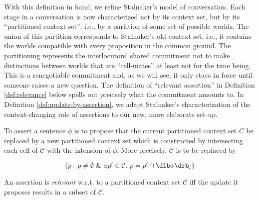 %
%
%
With this definition in hand, we refine Stalnaker's model of conversation. Each
stage in a conversation is now characterized not by its context set, but by its
``partitioned context set'', i.e., by a partition of some set of possible
worlds. The union of this partition corresponds to Stalnaker's old context set,
i.e., it contains the worlds compatible with every proposition in the common
ground. The partitioning represents the interlocutors' shared commitment not to
make distinctions between worlds that are ``cell-mates'' \dash at least not for
the time being. This is a renegotiable commitment and, as we will see, it only
stays in force until someone raises a new question. The definition of ``relevant
assertion'' in Definition \ref{def:relevance} below spells out precisely what
the commitment amounts to. In Definition \ref{def:update-by-assertion}, we adapt
Stalnaker's characterization of the context-changing role of assertions to our
new, more elaborate set-up.

\begin{definition}\label{def:update-by-assertion}
  To assert a sentence $\phi$ is to propose that the current partitioned context
  set $C$ be replaced by a new partitioned context set which is constructed by
  intersecting each cell of $\mathcal{C}$ with the intension of $\phi$. More
  precisely, $\mathcal{C}$ is to be replaced by

  $$\{p\co p\neq\emptyset\ \&\ \exists p'\in \mathcal{C}.\ p = p' \cap \svcent{\phi}\}$$
\end{definition}

\begin{definition}[Relevance]\label{def:relevance}
  An assertion is \emph{relevant} w.r.t. to a partitioned context set
  $\mathcal{C}$ iff the update it proposes results in a subset of $\mathcal{C}$.
\end{definition}

